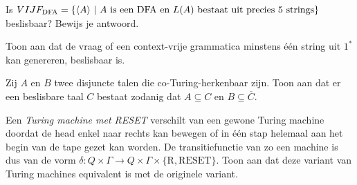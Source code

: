 \documentclass[a4paper]{article}
\begin{document}
\begin{question}
Is $VIJF_{\rm DFA} = \{ \langle A \rangle \ | \ \text{$A$ is een DFA en $L(A)$ bestaat uit precies 5 strings} \} $ beslisbaar? Bewijs je antwoord.
\begin{answer}

\end{answer}
\end{question}

\begin{question}
Toon aan dat de vraag of een context-vrije grammatica minstens \'e\'en string uit $1^*$ kan genereren, beslisbaar is.
\end{question}

\begin{question}
Zij $A$ en $B$ twee disjuncte talen die co-Turing-herkenbaar zijn. Toon aan dat er een beslisbare taal $C$ bestaat zodanig dat $A \subseteq C$ en $B \subseteq \overline{C}$.
\begin{answer}

\end{answer}
\end{question}

\begin{question}
Een \emph{Turing machine met RESET} verschilt van een gewone Turing machine doordat de head enkel naar rechts kan bewegen of in \'e\'en stap helemaal aan het begin van de tape gezet kan worden. De transitiefunctie van zo een machine is dus van de vorm $\delta : Q \times \Gamma \to Q \times \Gamma \times \{ \text{R}, \text{RESET} \}$. Toon aan dat deze variant van Turing machines equivalent is met de originele variant.
\begin{answer}

\end{answer}
\end{question}
\end{document}
